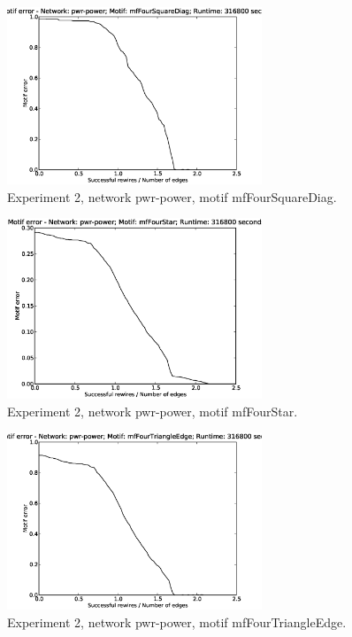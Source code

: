 \begin{figure}[p]
\centering
\includegraphics[width=3in]{Figures/motif_error-pwr-power-mfFourSquareDiag.eps}
\caption{Experiment 2, network pwr-power, motif mfFourSquareDiag.}
\label{fig:exp2-pwr-power-mfFourSquareDiag}
\end{figure}

\begin{figure}[p]
\centering
\includegraphics[width=3in]{Figures/motif_error-pwr-power-mfFourStar.eps}
\caption{Experiment 2, network pwr-power, motif mfFourStar.}
\label{fig:exp2-pwr-power-mfFourStar}
\end{figure}

\begin{figure}[p]
\centering
\includegraphics[width=3in]{Figures/motif_error-pwr-power-mfFourTriangleEdge.eps}
\caption{Experiment 2, network pwr-power, motif mfFourTriangleEdge.}
\label{fig:exp2-pwr-power-mfFourTriangleEdge}
\end{figure}


